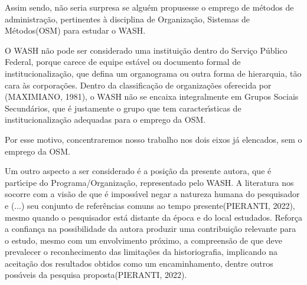 \documentclass[
12pt,		%
openright,	%
twoside,  %
a4paper,			%
chapter=TITLE,		%
english,			%
french,				%
spanish,			%
brazil				%
]{USPSC-classe/USPSC}
\begin{document}
Assim sendo, n\~ao seria surpresa se algu\'em propusesse o emprego de m\'etodos de administra\c{c}\~ao, pertinentes \`a disciplina de \textquotedbl Organiza\c{c}\~ao, Sistemas de M\'etodos\textquotedbl  (OSM) para estudar o WASH.










\noindent\begin{center}\mbox{\centering{}}\end{center}


O WASH n\~ao pode ser considerado uma institui\c{c}\~ao dentro do Servi\c{c}o P\'ublico Federal, porque carece de equipe est\'avel ou documento formal de institucionaliza\c{c}\~ao, que defina um organograma ou outra forma de hierarquia, t\~ao cara \`as corpora\c{c}\~oes. Dentro da classifica\c{c}\~ao de organiza\c{c}\~oes oferecida por (MAXIMIANO, 1981), o WASH n\~ao se encaixa integralmente em \textquotedbl Grupos Sociais Secund\'arios\textquotedbl , que \'e justamente o grupo que tem caracter\'{\i}sticas de institucionaliza\c{c}\~ao adequadas para o emprego da OSM.









Por esse motivo, concentraremos nosso trabalho nos dois eixos j\'a elencados, sem o emprego da OSM.









Um outro aspecto a ser considerado \'e a posi\c{c}\~ao da presente autora, que \'e part\'{\i}cipe do Programa/Organiza\c{c}\~ao, representado pelo WASH. A literatura nos socorre com a vis\~ao de que \'e imposs\'{\i}vel \textquotedbl negar a natureza humana do pesquisador e (...) seu conjunto de refer\^encias comuns ao tempo presente\textquotedbl  (PIERANTI, 2022), mesmo quando o pesquisador est\'a \textquotedbl distante da \'epoca e do local estudados\textquotedbl . Refor\c{c}a a confian\c{c}a na possibilidade da autora produzir uma contribui\c{c}\~ao relevante para o  estudo, mesmo com um envolvimento pr\'oximo, a compreens\~ao de que \textquotedbl deve prevalecer o reconhecimento das limita\c{c}\~oes da historiografia, implicando na aceita\c{c}\~ao dos resultados obtidos como um encaminhamento, dentre outros poss\'{\i}veis da pesquisa proposta\textquotedbl  (PIERANTI, 2022).
\end{document}
